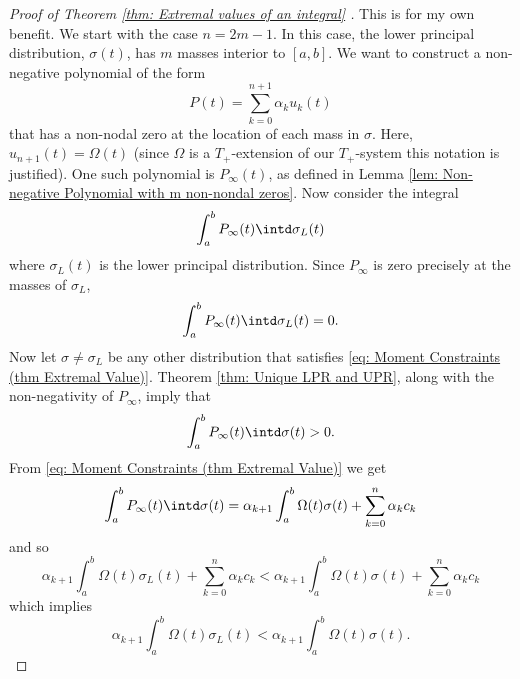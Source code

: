 \begin{proof}[Proof of Theorem \ref{thm: Extremal values of an integral} ]
	This is for my own benefit. 
	We start with the case $n = 2m -1$.	In this case, the lower principal distribution, $\sigma(t)$, has $m$ masses interior to $[a,b]$. %
	We want to construct a non-negative polynomial of the form
	\begin{equation}
	P(t) = \sum_{k = 0}^{n+1} \alpha_k u_k(t)
	\end{equation}
	that has a non-nodal zero at the location of each mass in $\sigma$. Here, $u_{n+1}(t) = \Omega(t)$ (since $\Omega$ is a $T_+$-extension of our $T_+$-system this notation is justified). One such polynomial is $P_\infty(t)$, as defined in Lemma \ref{lem: Non-negative Polynomial with m non-nondal zeros}. Now consider the integral
	\begin{equation}
	\int_a^b P_\infty(t) \intd \sigma_L(t)%
	\end{equation}
	where $\sigma_L(t)$ is the lower principal distribution.
	Since $P_\infty$ is zero precisely at the masses of $\sigma_L$,
	\begin{equation}
	\int_a^b P_\infty(t) \intd \sigma_L(t) = 0.
	\end{equation}
	Now let $\sigma \neq \sigma_L$ be any other distribution that satisfies \eqref{eq: Moment Constraints (thm Extremal Value)}. Theorem \ref{thm: Unique LPR and UPR}, along with the non-negativity of $P_\infty$, imply that
	\begin{equation}
	\int_a^b P_\infty(t) \intd \sigma(t) > 0.
	\end{equation}
	From \eqref{eq: Moment Constraints (thm Extremal Value)} we get
	\begin{equation}
	 \int_a^b P_\infty(t) \intd \sigma(t) = \alpha_{k+1} \int_a^b \Omega(t) \sigma(t) + \sum_{k=0}^n \alpha_k c_k
	 \end{equation}
	 and so
	 \begin{equation}
	 \alpha_{k+1} \int_a^b \Omega(t) \sigma_L(t) + \sum_{k=0}^n \alpha_k c_k < \alpha_{k+1} \int_a^b \Omega(t) \sigma(t) + \sum_{k=0}^n \alpha_k c_k
	 \end{equation}
	 which implies
	 \begin{equation}
		 \alpha_{k+1} \int_a^b \Omega(t) \sigma_L(t) <  \alpha_{k+1} \int_a^b \Omega(t) \sigma(t).
		 \label{eq: Final Inequality Alpha}
	 \end{equation}

\end{proof}
